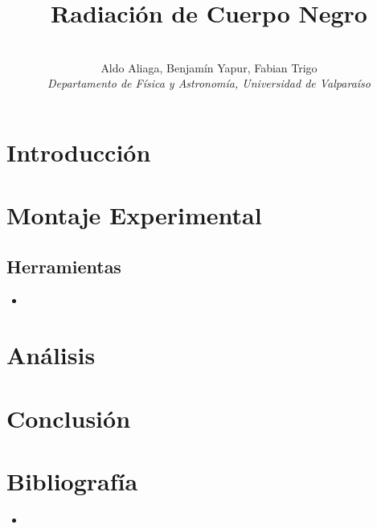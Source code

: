 \documentclass[a4paper,twocolumn,10pt]{article}
\begin{document}
\title{Radiación de Cuerpo Negro}
\author{ \\Aldo Aliaga, Benjamín Yapur, Fabian Trigo \\ \textit{Departamento de Física y Astronomía, Universidad de Valparaíso}}
\twocolumn[
  \begin{@twocolumnfalse}
    \maketitle
    \begin{abstract}
  
    \end{abstract}
  \end{@twocolumnfalse}\bigskip]

\vspace{2cm}

\section{Introducción}



\section{Montaje Experimental}
\subsection{Herramientas}
\begin{itemize} 
\item 
\end{itemize}




\section{Análisis}




\section{Conclusión}
\section{Bibliografía}


\begin{itemize}
\item

‌

\end{itemize}
\end{document}
